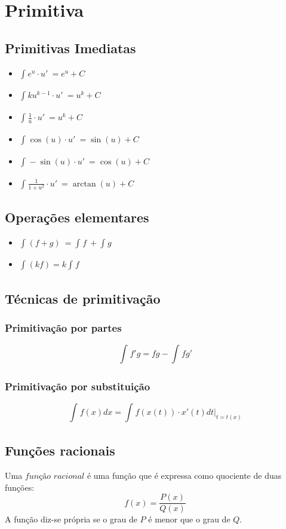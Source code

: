 \documentclass[10pt,a4paper]{report}
\begin{document}
\chapter{Primitiva}
\section{Primitivas Imediatas}
\begin{itemize}
\item $\int_{}^{} e^u \cdot u'\ = e^u + C$
\item $\int_{}^{} ku^{k-1} \cdot u'\ = u^k + C$
\item $\int_{}^{} \frac{1}{u} \cdot u'\ = u^k + C$
\item $\int_{}^{} \cos(u) \cdot u'\ = \sin(u) + C$
\item $\int_{}^{} -\sin(u) \cdot u'\ = \cos(u) + C$
\item $\int_{}^{} \frac{1}{1+u^2} \cdot u'\ = \arctan(u) + C$
\end{itemize}

\section{Operações elementares}
\begin{itemize}
\item $\int_{}^{} (f + g)\ = \int_{}^{} f\ + \int_{}^{} g$
\item $\int_{}^{} (kf) = k\int_{}^{} f$
\end{itemize}

\section{Técnicas de primitivação}
\subsection{Primitivação por partes}
$$
\int_{}^{} f'g = fg - \int_{}^{} fg'
$$
\subsection{Primitivação por substituição}
$$
\int_{}^{} f(x) dx = \int_{}^{} f(x(t)) \cdot x'(t) dt|_{t=t(x)}
$$

\section{Funções racionais}
Uma $função$ $racional$ é uma função que é expressa como quociente de duas funções:
$$
f(x) = \frac{P(x)}{Q(x)}
$$
A função diz-se própria se o grau de $P$ é menor que o grau de $Q$.
\end{document}
